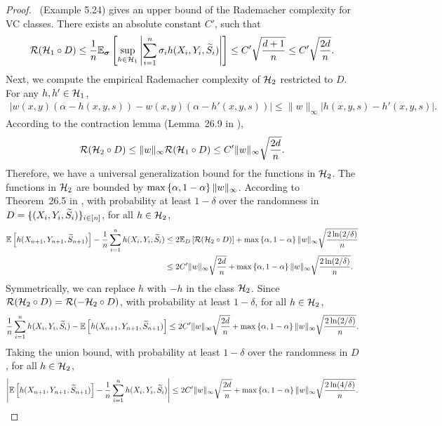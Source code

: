 \begin{proof}
\citet{WW19}~(Example 5.24) gives an upper bound of the Rademacher complexity for VC classes. There exists an absolute constant $C'$, such that
\begin{align*}
    {\cal R}({\cal H}_1 \circ D) \leq \frac{1}{n} \mathbb{E}_{\boldsymbol{\sigma}}\left[ \sup_{h\in{\cal H}_1} \left|\sum_{i=1}^n \sigma_i h(X_i,Y_i,{\widetilde{S}}_i)\right|  \right] \leq C' \sqrt {\frac{d+1}{n}} \leq C' \sqrt {\frac{2d}{n}}.
\end{align*}
Next, we compute the empirical Rademacher complexity of ${\cal H}_2$ restricted to $D$. For any $h, h' \in {\cal H}_1$, 
\begin{align*}
    \left| w(x,y)(\alpha-h(x,y,s)) - w(x,y)(\alpha-h'(x,y,s)) \right| \leq \|w\|_\infty \left|h(x,y,s) - h'(x,y,s) \right|.
\end{align*}
According to the contraction lemma (Lemma~26.9 in \citet{SL14}), 
\begin{align*}
    {\cal R}({\cal H}_2 \circ D) \leq \|w\|_\infty {\cal R}({\cal H}_1\circ D) \leq C'\|w\|_\infty \sqrt {\frac{2d}{n}}.
\end{align*}
Therefore, we have a universal generalization bound for the functions in ${\cal H}_2$. The functions in ${\cal H}_2$ are bounded by $\max\left\{ \alpha, 1-\alpha \right\} \|w\|_\infty$. According to Theorem~26.5 in \citet{SL14}, with probability at least $1-\delta$ over the randomness in $D = \{(X_i,Y_i, {\widetilde{S}}_i)\}_{i\in [n]}$, for all $h\in{\cal H}_2$,
\begin{align*}
    \mathbb{E}\left[ h(X_{n+1}, Y_{n+1}, {\widetilde{S}}_{n+1}) \right] - \frac{1}{n} \sum_{i=1}^n h(X_i, Y_i, {\widetilde{S}}_i) &\leq  2\mathbb{E}_D\left[ {\cal R}({\cal H}_2\circ D) \right] + \max\left\{ \alpha, 1-\alpha \right\} \|w\|_\infty  \sqrt{\frac{2 \ln(2/\delta)}{n}} \\
    &\leq 2C'\|w\|_\infty \sqrt {\frac{2d}{n}} + \max\left\{ \alpha, 1-\alpha \right\} \|w\|_\infty  \sqrt{\frac{2 \ln(2/\delta)}{n}}.
\end{align*}
Symmetrically, we can replace $h$ with $-h$ in the class ${\cal H}_2$. Since ${\cal R}({\cal H}_2\circ D) = {\cal R}(-{\cal H}_2\circ D)$, with probability at least $1-\delta$, for all $h\in{\cal H}_2$,
\begin{align*}
       \frac{1}{n} \sum_{i=1}^n h(X_i, Y_i, {\widetilde{S}}_i) - \mathbb{E}\left[ h(X_{n+1}, Y_{n+1}, {\widetilde{S}}_{n+1}) \right]
    \leq 2C'\|w\|_\infty \sqrt {\frac{2d}{n}} + \max\left\{ \alpha, 1-\alpha \right\} \|w\|_\infty  \sqrt{\frac{2 \ln(2/\delta)}{n}}.
\end{align*}
Taking the union bound, with probability at least $1-\delta$ over the randomness in $D$, for all $h\in{\cal H}_2$,
\begin{align*}
    \left|\EE\qth{h(X_{n+1}, Y_{n+1}, \tS_{n+1})} - \frac{1}{n} \sum_{i=1}^n h(X_i, Y_i, \tS_i) \right| \leq 2C'\|w\|_\infty \sqrt {\frac{2d}{n}} + \max\sth{\alpha, 1-\alpha} \|w\|_\infty  \sqrt{\frac{2 \ln(4/\delta)}{n}}.

\end{align*}
\end{proof}
